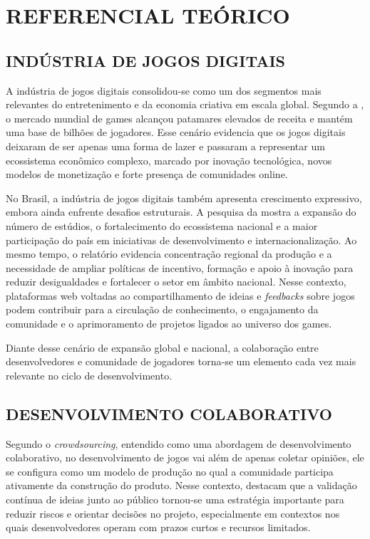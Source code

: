 

\chapter{REFERENCIAL TEÓRICO} \label{cha:referencial-teorico}


\section{INDÚSTRIA DE JOGOS DIGITAIS}

A indústria de jogos digitais consolidou-se como um dos segmentos mais relevantes do entretenimento e da economia criativa em escala global. Segundo a , o mercado mundial de games alcançou patamares elevados de receita e mantém uma base de bilhões de jogadores. Esse cenário evidencia que os jogos digitais deixaram de ser apenas uma forma de lazer e passaram a representar um ecossistema econômico complexo, marcado por inovação tecnológica, novos modelos de monetização e forte presença de comunidades online.

No Brasil, a indústria de jogos digitais também apresenta crescimento expressivo, embora ainda enfrente desafios estruturais. A pesquisa da  mostra a expansão do número de estúdios, o fortalecimento do ecossistema nacional e a maior participação do país em iniciativas de desenvolvimento e internacionalização. Ao mesmo tempo, o relatório evidencia concentração regional da produção e a necessidade de ampliar políticas de incentivo, formação e apoio à inovação para reduzir desigualdades e fortalecer o setor em âmbito nacional. Nesse contexto, plataformas web voltadas ao compartilhamento de ideias e \textit{feedbacks} sobre jogos podem contribuir para a circulação de conhecimento, o engajamento da comunidade e o aprimoramento de projetos ligados ao universo dos games.

Diante desse cenário de expansão global e nacional, a colaboração entre desenvolvedores e comunidade de jogadores torna-se um elemento cada vez mais relevante no ciclo de desenvolvimento.


\section{DESENVOLVIMENTO COLABORATIVO}

Segundo  o \textit{crowdsourcing}, entendido como uma abordagem de desenvolvimento colaborativo, no desenvolvimento de jogos vai além de apenas coletar opiniões, ele se configura como um modelo de produção no qual a comunidade participa ativamente da construção do produto. Nesse contexto,  destacam que a validação contínua de ideias junto ao público tornou-se uma estratégia importante para reduzir riscos e orientar decisões no projeto, especialmente em contextos nos quais desenvolvedores operam com prazos curtos e recursos limitados.

